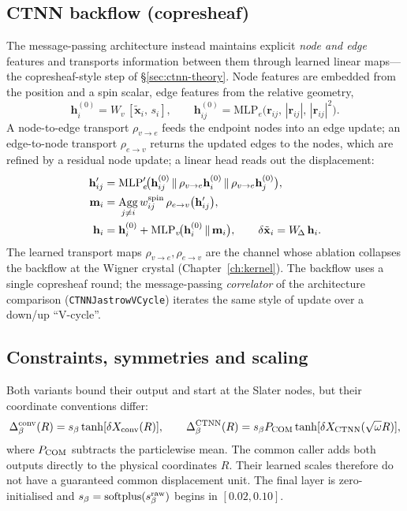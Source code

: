 \subsection{CTNN backflow (copresheaf)}
\label{subsec:ctnn-backflow}
The message-passing architecture instead maintains
explicit \emph{node and edge} features and transports information between them through
learned linear maps---the copresheaf-style step of \S\ref{sec:ctnn-theory}. Node features
are embedded from the position and a spin scalar, edge features from the relative geometry,
\begin{equation}
  \mathbf h_i^{(0)} = W_v\,[\tilde{\mathbf x}_i,\, s_i],
  \qquad
  \mathbf h_{ij}^{(0)} = \mathrm{MLP}_e\!\big(\mathbf r_{ij},\, |\mathbf r_{ij}|,\, |\mathbf r_{ij}|^2\big).
\end{equation}
A node-to-edge transport $\rho_{v\to e}$ feeds the endpoint nodes into an edge update; an
edge-to-node transport $\rho_{e\to v}$ returns the updated edges to the nodes, which are
refined by a residual node update; a linear head reads out the displacement:
\begin{align}
  \mathbf h_{ij}' &= \mathrm{MLP}_e'\!\big(\mathbf h_{ij}^{(0)}\,\|\,\rho_{v\to e}\mathbf h_i^{(0)}\,\|\,\rho_{v\to e}\mathbf h_j^{(0)}\big),
  \label{eq:ctnn-edge}\\
  \mathbf m_i &= \operatorname*{Agg}_{j\neq i} w_{ij}^{\rm spin}\,\rho_{e\to v}\big(\mathbf h_{ij}'\big),
  \label{eq:ctnn-agg}\\
  \mathbf h_i &= \mathbf h_i^{(0)} + \mathrm{MLP}_v\!\big(\mathbf h_i^{(0)}\,\|\,\mathbf m_i\big),
  \qquad
  \delta\tilde{\mathbf x}_i = W_{\!\Delta}\,\mathbf h_i.
  \label{eq:ctnn-node}
\end{align}
The learned transport maps $\rho_{v\to e},\rho_{e\to v}$ are the channel whose ablation
collapses the backflow at the Wigner crystal (Chapter~\ref{ch:kernel}). The backflow uses a
single copresheaf round; the message-passing \emph{correlator} of the architecture
comparison (\texttt{CTNNJastrowVCycle}) iterates the same style of update over a down/up
``V-cycle''.

\subsection{Constraints, symmetries and scaling}
\label{sec:bf-init}
Both variants bound their output and start at the Slater nodes, but their coordinate
conventions differ:
\begin{equation}
  \Delta_\beta^{\rm conv}(R)=s_\beta\tanh[\delta X_{\rm conv}(R)],\qquad
  \Delta_\beta^{\rm CTNN}(R)=s_\beta P_{\rm COM}
  \tanh[\delta X_{\rm CTNN}(\sqrt{\omega}R)],
  \label{eq:bf-bound-scale}
\end{equation}
where $P_{\rm COM}$ subtracts the particlewise mean. The common caller adds both outputs
directly to the physical coordinates $R$. Their learned scales therefore do not have a
guaranteed common displacement unit. The final layer is zero-initialised and
$s_\beta=\mathrm{softplus}(s_\beta^{\rm raw})$ begins in $[0.02,0.10]$.

